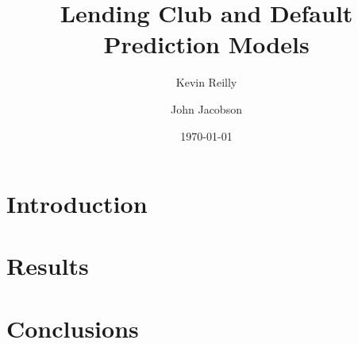 \documentclass[11pt]{article}
\title{Lending Club and Default Prediction Models}
\author{Kevin Reilly}
\author{John Jacobson}
\affil{University of Utah -- Machine Learning}
\date{\today}
\begin{document}
\maketitle

\begin{abstract}
	
\end{abstract}

\section{Introduction}







\section{Results}\label{sec:Results}



\section{Conclusions}




\nocite{*}




\end{document}
